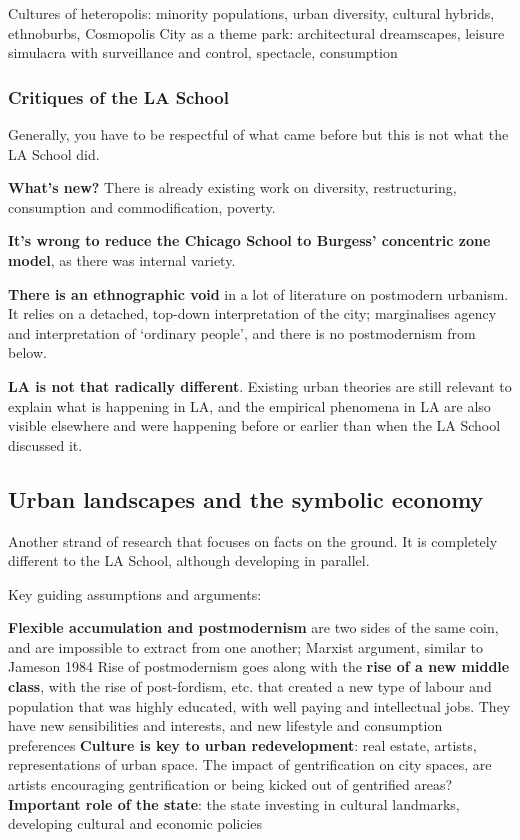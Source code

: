 \documentclass{article}
\begin{document}
\begin{outline}
	\1 Cultures of heteropolis: minority populations, urban diversity, cultural hybrids, ethnoburbs, Cosmopolis
	\1 City as a theme park: architectural dreamscapes, leisure simulacra with surveillance and control, spectacle, consumption
\end{outline}

\subsubsection{Critiques of the LA School}

Generally, you have to be respectful of what came before but this is not what the LA School did.

\textbf{What's new?} There is already existing work on diversity, restructuring, consumption and commodification, poverty.

\textbf{It's wrong to reduce the Chicago School to Burgess' concentric zone model}, as there was internal variety.

\textbf{There is an ethnographic void} in a lot of literature on postmodern urbanism. It relies on a detached, top-down interpretation of the city; marginalises agency and interpretation of `ordinary people', and there is no postmodernism from below.

\textbf{LA is not that radically different}. Existing urban theories are still relevant to explain what is happening in LA, and the empirical phenomena in LA are also visible elsewhere and were happening before or earlier than when the LA School discussed it.

\subsection{Urban landscapes and the symbolic economy}

Another strand of research that focuses on facts on the ground. It is completely different to the LA School, although developing in parallel.

Key guiding assumptions and arguments:

\begin{outline}
	\1 \textbf{Flexible accumulation and postmodernism} are two sides of the same coin, and are impossible to extract from one another; Marxist argument, similar to Jameson 1984
	\1 Rise of postmodernism goes along with the \textbf{rise of a new middle class}, with the rise of post-fordism, etc. that created a new type of labour and population that was highly educated, with well paying and intellectual jobs. They have new sensibilities and interests, and new lifestyle and consumption preferences
	\1 \textbf{Culture is key to urban redevelopment}: real estate, artists, representations of urban space. The impact of gentrification on city spaces, are artists encouraging gentrification or being kicked out of gentrified areas?
	\1 \textbf{Important role of the state}: the state investing in cultural landmarks, developing cultural and economic policies
\end{outline}
\end{document}
